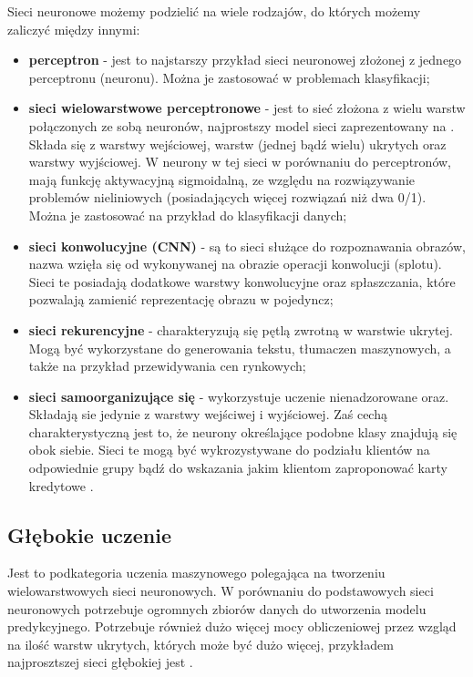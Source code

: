 Sieci neuronowe możemy podzielić na wiele rodzajów, do których możemy zaliczyć między innymi:
\begin{itemize}
    \item \textbf{perceptron} - jest to najstarszy przykład sieci neuronowej złożonej z jednego perceptronu (neuronu). Można je zastosować w problemach klasyfikacji;
    \item \textbf{sieci wielowarstwowe perceptronowe} - jest to sieć złożona z wielu warstw połączonych ze sobą neuronów, najprostszy model sieci zaprezentowany na . Składa się z warstwy wejściowej, warstw (jednej bądź wielu) ukrytych oraz warstwy wyjściowej. W neurony w tej sieci w porównaniu do perceptronów, mają funkcję aktywacyjną sigmoidalną, ze względu na rozwiązywanie problemów nieliniowych (posiadających więcej rozwiązań niż dwa 0/1). Można je zastosować na przykład do klasyfikacji danych;
    \item \textbf{sieci konwolucyjne (CNN)} - są to sieci służące do rozpoznawania obrazów, nazwa wzięła się od wykonywanej na obrazie operacji konwolucji (splotu). Sieci te posiadają dodatkowe warstwy konwolucyjne oraz spłaszczania, które pozwalają zamienić reprezentację obrazu w pojedyncz;
    \item \textbf{sieci rekurencyjne} - charakteryzują się pętlą zwrotną w warstwie ukrytej. Mogą być wykorzystane do generowania tekstu, tłumaczen maszynowych, a także na przykład przewidywania cen rynkowych;
    \item \textbf{sieci samoorganizujące się} - wykorzystuje uczenie nienadzorowane oraz. Składają sie jedynie z warstwy wejściwej i wyjściowej. Zaś cechą charakterystyczną jest to, że neurony określające podobne klasy znajdują się obok siebie. Sieci te mogą być wykrozystywane do podziału klientów na odpowiednie grupy bądź do wskazania jakim klientom zaproponować karty kredytowe \cite{IBMNetwork, BartosSOM}.
\end{itemize}

\subsection{Głębokie uczenie}
Jest to podkategoria uczenia maszynowego polegająca na tworzeniu wielowarstwowych sieci neuronowych. W porównaniu do podstawowych sieci neuronowych potrzebuje ogromnych zbiorów danych do utworzenia modelu predykcyjnego. Potrzebuje również dużo więcej mocy obliczeniowej przez wzgląd na ilość warstw ukrytych, których może być dużo więcej, przykładem najprosztszej sieci głębokiej jest .

